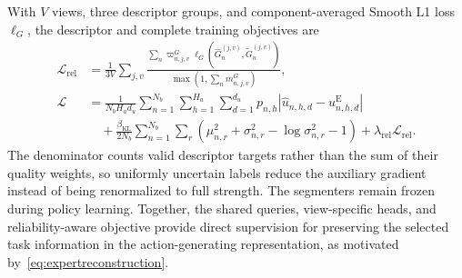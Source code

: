 With $V$ views, three descriptor groups, and component-averaged Smooth L1 loss $\ell_G$, the descriptor and complete training objectives are
\begin{align}
 \mathcal L_{\mathrm{rel}}
 &=\frac{1}{3V}\sum_{j,v}
   \frac{\sum_n\varpi_{n,j,v}^{G}
      \ell_G(\widehat G_n^{(j,v)},\widetilde G_n^{(j,v)})}
        {\max(1,\sum_n m_{n,j,v}^{G})},\nonumber\\
 \mathcal L
 &=\frac{1}{N_bH_ad_u}
  \sum_{n=1}^{N_b}\sum_{h=1}^{H_a}\sum_{d=1}^{d_u}
  p_{n,h}\left|\widehat u_{n,h,d}-u_{n,h,d}^{\mathrm E}\right|
  \nonumber\\
 &\quad+\frac{\beta_{\mathrm{KL}}}{2N_b}
  \sum_{n=1}^{N_b}\sum_r
  \left(\mu_{n,r}^{2}+\sigma_{n,r}^{2}
  -\log\sigma_{n,r}^{2}-1\right)
  +\lambda_{\mathrm{rel}}\mathcal L_{\mathrm{rel}}.
 \label{eq:methodbaseloss}
\end{align}
The denominator counts valid descriptor targets rather than the sum of their quality weights, so uniformly uncertain labels reduce the auxiliary gradient instead of being renormalized to full strength.
The segmenters remain frozen during policy learning.
Together, the shared queries, view-specific heads, and reliability-aware objective provide direct supervision for preserving the selected task information in the action-generating representation, as motivated by~\eqref{eq:expertreconstruction}.
